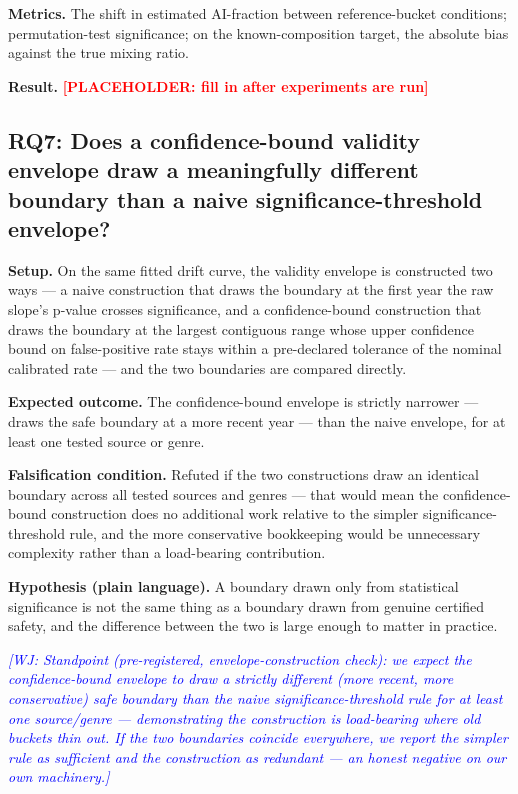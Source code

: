 \documentclass[conference]{IEEEtran}
\newcommand{\placeholder}[1]{\textcolor{red}{\textbf{[PLACEHOLDER: #1]}}}
\newcommand{\wj}[1]{\textcolor{blue}{\emph{[WJ: #1]}}}
\begin{document}
\textbf{Metrics.} The shift in estimated AI-fraction between reference-bucket conditions; permutation-test significance; on the known-composition target, the absolute bias against the true mixing ratio.

\textbf{Result.} \placeholder{fill in after experiments are run}

\subsection{RQ7: Does a confidence-bound validity envelope draw a meaningfully different boundary than a naive significance-threshold envelope?}

 \textbf{Setup.} On the same fitted drift curve, the validity envelope is constructed two ways --- a naive construction that draws the boundary at the first year the raw slope's p-value crosses significance, and a confidence-bound construction that draws the boundary at the largest contiguous range whose upper confidence bound on false-positive rate stays within a pre-declared tolerance of the nominal calibrated rate --- and the two boundaries are compared directly.

\textbf{Expected outcome.} The confidence-bound envelope is strictly narrower --- draws the safe boundary at a more recent year --- than the naive envelope, for at least one tested source or genre.

\textbf{Falsification condition.} Refuted if the two constructions draw an identical boundary across all tested sources and genres --- that would mean the confidence-bound construction does no additional work relative to the simpler significance-threshold rule, and the more conservative bookkeeping would be unnecessary complexity rather than a load-bearing contribution.

\textbf{Hypothesis (plain language).} A boundary drawn only from statistical significance is not the same thing as a boundary drawn from genuine certified safety, and the difference between the two is large enough to matter in practice.

\wj{Standpoint (pre-registered, envelope-construction check): we expect the confidence-bound envelope to draw a strictly different (more recent, more conservative) safe boundary than the naive significance-threshold rule for at least one source/genre --- demonstrating the construction is load-bearing where old buckets thin out. If the two boundaries coincide everywhere, we report the simpler rule as sufficient and the construction as redundant --- an honest negative on our own machinery.}
\end{document}
